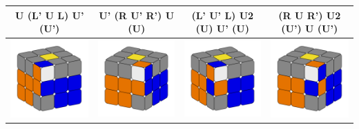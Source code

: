 \documentclass[12pt, a3paper]{article}
\newcommand{\scale}{1}
\begin{document}
\begin{center}
\begin{longtable}{c|c||c|c}
	U (L' U L) U' (U') & U' (R U' R') U (U) & (L' U' L) U2 (U) U' (U) & (R U R') U2 (U') U (U') \\
	\hline
	\hline
	\includegraphics[scale=\scale]{9l} & \includegraphics[scale=\scale]{9r}  &  \includegraphics[scale=\scale]{10l} & \includegraphics[scale=\scale]{10r} \\

\end{longtable}
\end{center}
\end{document}
